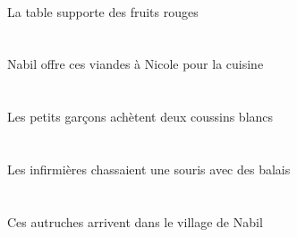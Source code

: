 \begin{exe}
\DEFSgErgG{}   \tableCSgErgG{}   \INDPlAbsG{}   \rougeBPlG{}   \fruitBPlAbsG{}  \supporterVtPrsBPlG{}\\
La table supporte des fruits rouges
\ex\glll
\DEFSgObl{}   \cuisineCSgObl{}   \POUR{}   \INDSgErg{}   \NabilBSgErg{}    \INDSgDat{}   \NicoleDSgDat{}   \DEMPlAbs{}   \viandeAPlAbs{}  \offrirVdPrsAPl{}\\
\DEFSgOblP{}   \cuisineCSgOblP{}   \POURP{}   \INDSgErgP{}   \NabilBSgErgP{}    \INDSgDatP{}   \NicoleDSgDatP{}   \DEMPlAbsP{}   \viandeAPlAbsP{}  \offrirVdPrsAPlP{}\\
\DEFSgOblG{}   \cuisineCSgOblG{}   \POURG{}   \INDSgErgG{}   \NabilBSgErgG{}    \INDSgDatG{}   \NicoleDSgDatG{}   \DEMPlAbsG{}   \viandeAPlAbsG{}  \offrirVdPrsAPlG{}\\
Nabil offre ces viandes à Nicole pour la cuisine
\ex\glll
\DEFPlErg{}   \petitBPl{}   \garconBPlErg{}   \INDDuAbs{}   \blancADu{}   \coussinADuAbs{}  \acheterVtPrsADu{}\\
\DEFPlErgP{}   \petitBPlP{}   \garconBPlErgP{}   \INDDuAbsP{}   \blancADuP{}   \coussinADuAbsP{}  \acheterVtPrsADuP{}\\
\DEFPlErgG{}   \petitBPlG{}   \garconBPlErgG{}   \INDDuAbsG{}   \blancADuG{}   \coussinADuAbsG{}  \acheterVtPrsADuG{}\\
Les petits garçons achètent deux coussins blancs
\ex\glll
\DEFPlErg{}   \infirmiereBPlErg{}    \INDPlObl{}   \balaiCPlObl{}   \AVEC{}   \INDSgAbs{}   \sourisASgAbs{}  \chasserVtPstASg{}\\
\DEFPlErgP{}   \infirmiereBPlErgP{}    \INDPlOblP{}   \balaiCPlOblP{}   \AVECP{}   \INDSgAbsP{}   \sourisASgAbsP{}  \chasserVtPstASgP{}\\
\DEFPlErgG{}   \infirmiereBPlErgG{}    \INDPlOblG{}   \balaiCPlOblG{}   \AVECG{}   \INDSgAbsG{}   \sourisASgAbsG{}  \chasserVtPstASgG{}\\
Les infirmières chassaient une souris avec des balais
\ex\glll
\DEMPlAbs{}   \autrucheDPlAbs{}    \DEFSgObl{}    \INDSgObl{}   \NabilBSgObl{}   \DE{}   \villageASgObl{}   \DANS{}  \arriverViPrsDPl{}\\
\DEMPlAbsP{}   \autrucheDPlAbsP{}    \DEFSgOblP{}    \INDSgOblP{}   \NabilBSgOblP{}   \DEP{}   \villageASgOblP{}   \DANSP{}  \arriverViPrsDPlP{}\\
\DEMPlAbsG{}   \autrucheDPlAbsG{}    \DEFSgOblG{}    \INDSgOblG{}   \NabilBSgOblG{}   \DEG{}   \villageASgOblG{}   \DANSG{}  \arriverViPrsDPlG{}\\
Ces autruches arrivent dans le village de Nabil
\ex\glll
\DEFSgObl{}   \maisonDSgObl{}   \DEVANT{}   \DEFPlErg{}   \chasseurCPlErg{}    \DEFDuDat{}   \petitCDu{}   \filleCDuDat{}   \INDSgAbs{}   \autrucheDSgAbs{}  \montrerVdPstDSg{}\\

\end{exe}

